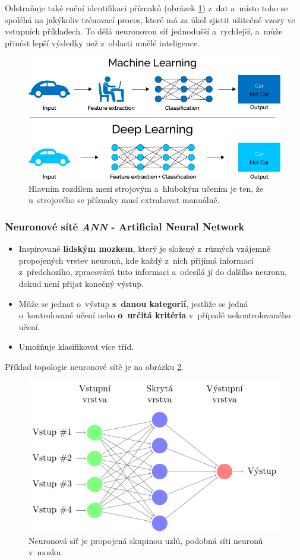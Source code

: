 Odstraňuje také ruční identifikaci příznaků (obrázek \ref{fig:ml_vs_ann}) z~dat a~místo toho se spoléhá na jakýkoliv trénovací proces, které má za úkol zjistit užitečné vzory ve vstupních příkladech. To dělá neuronovou síť jednodušší a~rychlejší, a~může přinést lepší výsledky než z~oblasti umělé inteligence.

\begin{figure}[H]
\centering
\includegraphics[width=.85\linewidth]{assets/9_ml_vs_ann}
\caption{Hlavním rozdílem mezi strojovým a~hlubokým učením je ten, že u~strojového se příznaky musí extrahovat manuálně. \cite{fig:mlvsann}}
\label{fig:ml_vs_ann}
\end{figure}

\subsubsection{Neuronové sítě \textit{ANN} - Artificial Neural Network}
\begin{itemize}
  \item Inspirované \textbf{lidským mozkem}, který je složený z~různých vzájemně propojených vrstev neuronů, kde každý z~nich přijímá informaci z~předchozího, zpracovává tuto informaci a~odesílá jí do dalšího neuronu, dokud není přijat konečný výstup.
  \item Může se jednat o~výstup \textbf{s~danou kategorií}, jestliže se jedná o~kontrolované učení nebo \textbf{o~určitá kritéria} v~případě nekontrolovaného učení.
  \item Umožňuje klasifikovat více tříd.
\end{itemize}
Příklad topologie neuronové sítě je na obrázku \ref{fig:ann}. 
\begin{figure}[H]
\centering
\includegraphics[width=.6\linewidth]{assets/9_ann.pdf}
\caption{Neuronová síť je propojená skupinou uzlů, podobná síti neuronů v~mozku.}
\label{fig:ann}
\end{figure}

